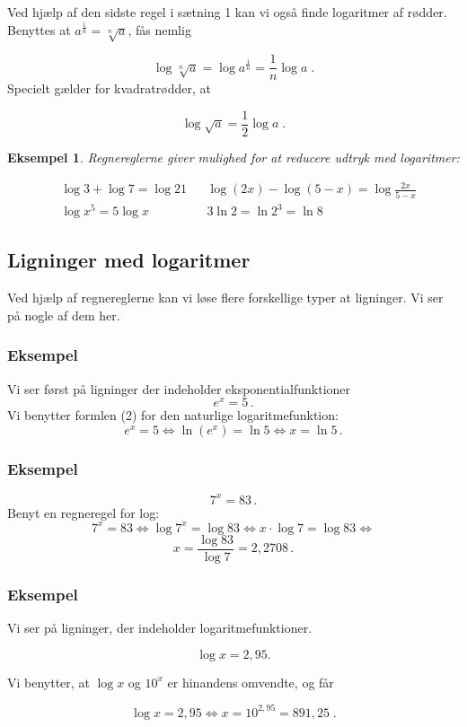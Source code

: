 \documentclass[12pt,oneside,a4paper]{article}
\theoremstyle{plain}
\newtheorem*{eks}{Eksempel}
\begin{document}
Ved hjælp af den sidste regel i sætning 1 kan vi også finde logaritmer af
rødder. Benyttes at $a^{\frac{1}{n}} = \sqrt[n]{a}$, fås nemlig

\[
\log \sqrt[n]{a} = \log a^{\frac{1}{n}} = \frac{1}{n} \log a \; .
\]
Specielt gælder for kvadratrødder, at

\[
\log \sqrt{a} = \frac{1}{2} \log a \; .
\]

\begin{eks}

Regnereglerne giver mulighed for at reducere udtryk med logaritmer:

\[
\begin{aligned}
    &\log 3 + \log 7 = \log 21 && \log (2x) - \log (5 - x) = \log \frac{2x}{5 - x} \\
    &\log x^5 = 5 \log x && 3 \ln 2 = \ln 2^3 = \ln 8
\end{aligned}
\]
\end{eks}

\subsection*{Ligninger med logaritmer}
Ved hjælp af regnereglerne kan vi løse flere forskellige typer at ligninger.
Vi ser på nogle af dem her.

\begin{tcolorbox}
\subsubsection*{Eksempel}
Vi ser først på ligninger der indeholder eksponentialfunktioner
\[
e^x = 5\,.
\]
Vi benytter formlen (2) for den naturlige logaritmefunktion:
\[
e^x = 5 \iff \ln (e^x) = \ln 5 \iff x = \ln 5\,.
\]
\end{tcolorbox}

\begin{tcolorbox}
\subsubsection*{Eksempel}
\[
    7^x = 83\,.
\]
Benyt en regneregel for log:
\[
7^x = 83 \iff \log 7^x = \log 83 \iff x \cdot \log 7 = \log 83 \iff 
\]
\[
    x = \frac{\log 83}{\log 7} = 2,2708\,.
\]
\end{tcolorbox}

\begin{tcolorbox}
\subsubsection*{Eksempel}

Vi ser på ligninger, der indeholder logaritmefunktioner. 

\[
\log x = 2,95.
\]

Vi benytter, at $\log x$ og $10^x$ er hinandens omvendte, og får

\[
\log x = 2,95 \iff x = 10^{2,95} = 891,25 \; .
\]
\end{tcolorbox}
\end{document}
